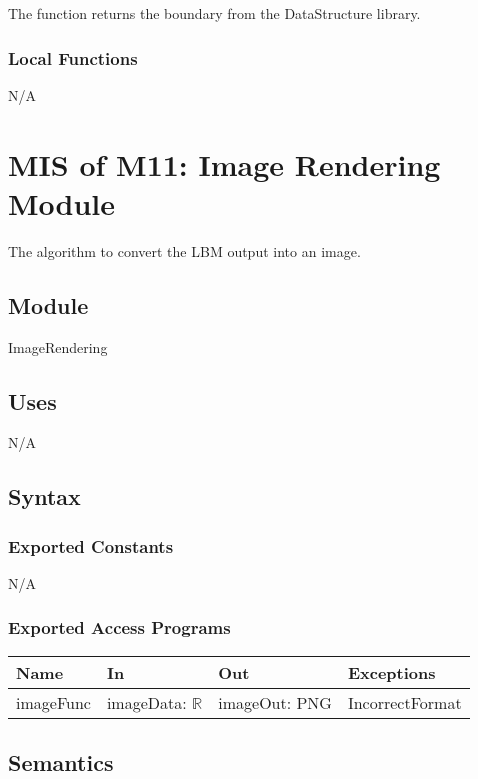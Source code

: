 \documentclass[12pt, titlepage]{article}
\begin{document}
The function returns the boundary from the DataStructure library.

\subsubsection{Local Functions}

N/A

\newpage

\section{MIS of M11: Image Rendering Module} \label{OUModule} 

The algorithm to convert the LBM output into an image.

\subsection{Module}

ImageRendering

\subsection{Uses}

N/A

\subsection{Syntax}

\subsubsection{Exported Constants}
N/A

\subsubsection{Exported Access Programs}

\begin{center}
	\begin{tabular}{p{2cm} p{4cm} p{4cm} p{2cm}}
		\hline
		\textbf{Name} & \textbf{In} & \textbf{Out} & \textbf{Exceptions} \\
		\hline
		imageFunc & imageData: $\mathbb{R}$ & imageOut: PNG & IncorrectFormat \\
		\hline
	\end{tabular}
\end{center}

\subsection{Semantics}
\end{document}
